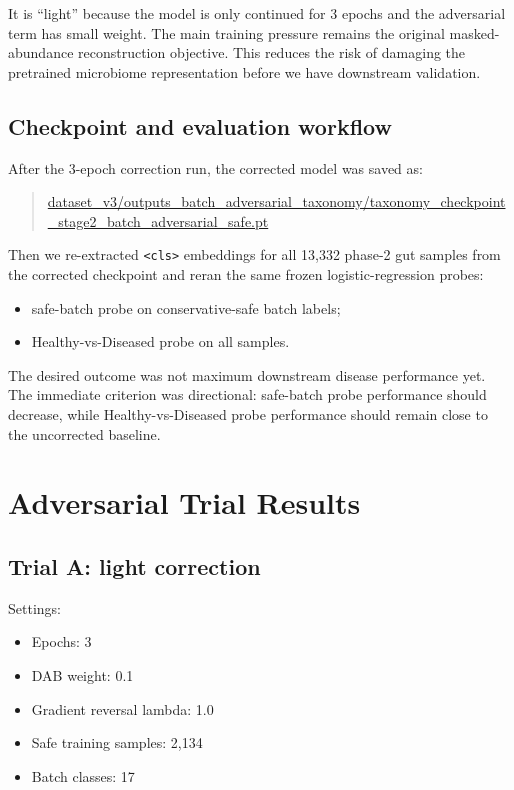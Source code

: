 \documentclass[11pt]{article}
\newcommand{\code}[1]{\texttt{\small #1}}
\newcommand{\filepath}[1]{\begingroup\urlstyle{tt}\small\url{#1}\endgroup}
\begin{document}
It is ``light'' because the model is only continued for 3 epochs and the adversarial term
has small weight. The main training pressure remains the original masked-abundance
reconstruction objective. This reduces the risk of damaging the pretrained microbiome
representation before we have downstream validation.

\subsection{Checkpoint and evaluation workflow}

After the 3-epoch correction run, the corrected model was saved as:

\begin{quote}
\filepath{dataset_v3/outputs_batch_adversarial_taxonomy/taxonomy_checkpoint_stage2_batch_adversarial_safe.pt}
\end{quote}

Then we re-extracted \code{<cls>} embeddings for all 13,332 phase-2 gut samples from the
corrected checkpoint and reran the same frozen logistic-regression probes:

\begin{itemize}
  \item safe-batch probe on conservative-safe batch labels;
  \item Healthy-vs-Diseased probe on all samples.
\end{itemize}

The desired outcome was not maximum downstream disease performance yet. The immediate
criterion was directional: safe-batch probe performance should decrease, while
Healthy-vs-Diseased probe performance should remain close to the uncorrected baseline.

\section{Adversarial Trial Results}

\subsection{Trial A: light correction}

Settings:

\begin{itemize}
  \item Epochs: 3
  \item DAB weight: 0.1
  \item Gradient reversal lambda: 1.0
  \item Safe training samples: 2,134
  \item Batch classes: 17
\end{itemize}
\end{document}
